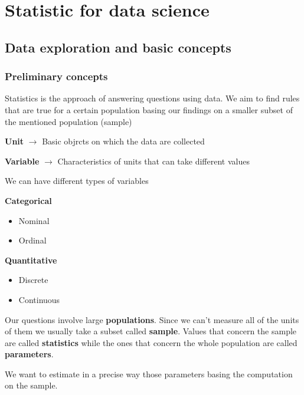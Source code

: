\section{Statistic for data science}


\subsection{Data exploration and basic concepts}

\subsubsection{Preliminary concepts}

Statistics is the approach of answering questions using data. We aim to find rules that are true for a certain population basing our findings on a smaller subset of the mentioned population (sample)

\vspace{10pt}

\textbf{Unit} $\xrightarrow{}$ Basic objrcts on which the data are collected

\textbf{Variable} $\xrightarrow{}$ Characteristics of units that can take different values

\vspace{10pt}

We can have different types of variables
\vspace{10pt}

\textbf{Categorical}
\begin{itemize}
    \item Nominal
    \item Ordinal
\end{itemize}

\textbf{Quantitative}
\begin{itemize}
    \item Discrete
    \item Continuous
\end{itemize}

Our questions involve large \textbf{populations}. Since we can't measure all of the units of them we usually take a subset called \textbf{sample}. Values that concern the sample are called \textbf{statistics} while the ones that concern the whole population are called \textbf{parameters}. 

\vspace{10pt}

We want to estimate in a precise way those parameters basing the computation on the sample.

